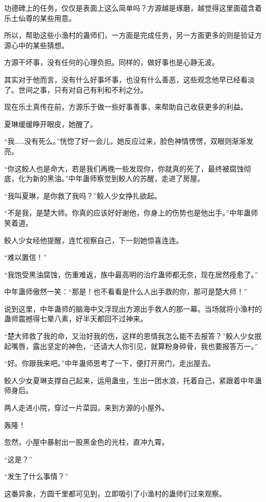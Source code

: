 \begin{this_body}
功德碑上的任务，仅仅是表面上这么简单吗？方源越是琢磨，越觉得这里面蕴含着乐土仙尊的某些用意。

所以，帮助这些小渔村的蛊师们，一方面是完成任务，另一方面更多的则是验证方源心中的某些猜想。

方源干坏事，没有任何的心理负担。同样的，做好事也是心静无波。

其实对于他而言，没有什么好事坏事，也没有什么善恶，这些观念他早已经看淡了。世间之事，只有对自己有利和不利之分。

现在乐土真传在前，方源乐于做一些好事善事，来帮助自己收获更多的利益。

夏琳缓缓睁开眼皮，她醒了。

“我……没有死么。”恍惚了好一会儿，她反应过来，脸色神情愣愣，双眼则渐渐发亮。

“你这鲛人也是命大，若是我们再晚一些发现你，你就真的死了，最终被腐蚀彻底，化为新的黑油。”中年蛊师察觉到鲛人的苏醒，走进了房屋。

“我叫夏琳，是你救了我吗？”鲛人少女挣扎欲起。

“不是我，是楚大师。你真的应该好好谢他，你身上的伤势也是他出手。”中年蛊师笑着道。

鲛人少女经他提醒，连忙视察自己，下一刻她惊喜连连。

“难以置信！”

“我饱受黑油腐蚀，伤重难返，族中最高明的治疗蛊师都无奈，现在居然痊愈了。”

中年蛊师傲然一笑：“那是！也不看看是什么人出手救的你，那可是楚大师！”

说到这里，中年蛊师的脑海中又浮现出方源出手救人的那一幕。当场就将小渔村的蛊师震撼得七晕八素，好半天都回不过神来。

“楚大师救了我的命，又治好我的伤，这样的恩情我怎么能不去报答？”鲛人少女抿起嘴唇，露出坚定的神色，“还请大人你引见，就算粉身碎骨，我也要报答万一。”

“好。你跟我来吧。”中年蛊师思考了一下，便打开房门，走出屋去。

鲛人少女夏琳支撑自己起来，运用蛊虫，生出一团水浪，托着自己，紧跟着中年蛊师身后。

两人走进小院，穿过一片菜园，来到方源的小屋外。

轰隆！

忽然，小屋中暴射出一股黑金色的光柱，直冲九霄。

“这是？”

“发生了什么事情？”

这番异象，方圆千里都可见到，立即吸引了小渔村的蛊师们过来观察。


\end{this_body}
